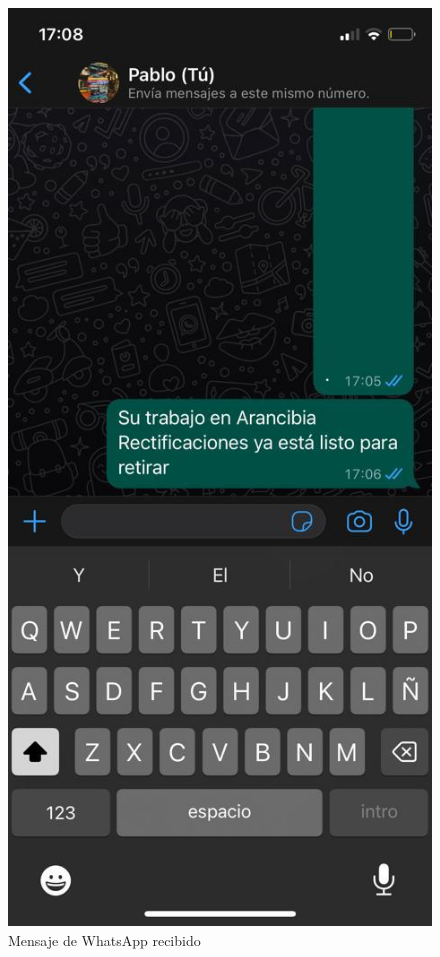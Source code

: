 \begin{figure}[H]
	\centering
	\includegraphics[scale=.30]{./Figures/ensayo-1/15.qr-api-1.jpeg}
	\caption{Mensaje de WhatsApp recibido}
	\label{fig:ensayomensajewcel2}
\end{figure}

